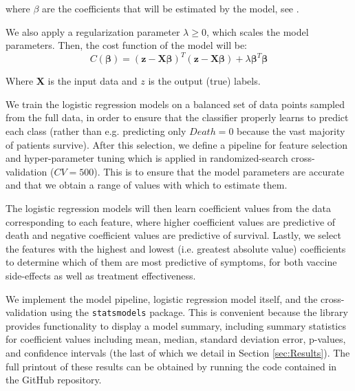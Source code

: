 \noindent where $\beta$ are the coefficients that will be estimated by the model, see \cite{Geron-Aurelien}. 

We also apply a regularization parameter $\lambda \geq 0$, which scales the model parameters. Then, the cost function of the model will be: $$C(\boldsymbol{\beta}) = (\boldsymbol{z} - \boldsymbol{X\beta})^T(\boldsymbol{z} - \boldsymbol{X\beta}) + \lambda \boldsymbol{\beta}^T\boldsymbol{\beta}$$

Where \textbf{X} is the input data and $z$ is the output (true) labels.

We train the logistic regression models on a balanced set of data points sampled from the full data, in order to ensure that the classifier properly learns to predict each class (rather than e.g. predicting only $Death = 0$ because the vast majority of patients survive). After this selection, we define a pipeline for feature selection and hyper-parameter tuning which is applied in randomized-search cross-validation ($CV=500$). This is to ensure that the model parameters are accurate and that we obtain a range of values with which to estimate them.

The logistic regression models will then learn coefficient values from the data corresponding to each feature, where higher coefficient values are predictive of death and negative coefficient values are predictive of survival. Lastly, we select the features with the highest and lowest (i.e. greatest absolute value) coefficients to determine which of them are most predictive of symptoms, for both vaccine side-effects as well as treatment effectiveness. 

We implement the model pipeline, logistic regression model itself, and the cross-validation using the \texttt{statsmodels} package. This is convenient because the library provides functionality to display a model summary, including summary statistics for coefficient values including mean, median, standard deviation error, p-values, and confidence intervals (the last of which we detail in Section \ref{sec:Results}). The full printout of these results can be obtained by running the code contained in the GitHub repository.
